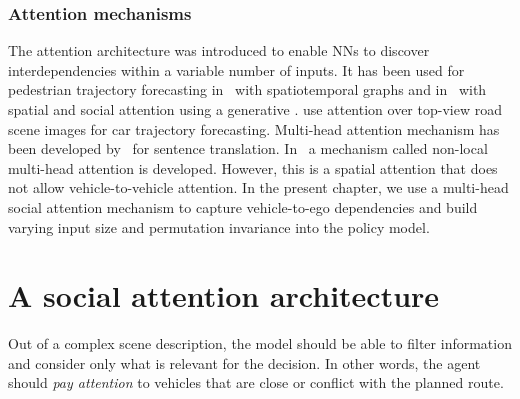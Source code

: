 \subsubsection{Attention mechanisms} 

The attention architecture was introduced to enable \glspl*{NN}  to discover interdepen\-dencies within a variable number of inputs.
It has been used for pedestrian trajectory forecasting in~\citep{Vemula2018} with spatiotemporal graphs and in~\citep{Sadeghian2019CVPR} with spatial and social attention using a generative . \citet{Sadeghian2018ECCV} use attention over top-view road scene images for car trajectory forecasting. Multi-head attention mechanism has been developed by~\citet{Vaswani2017} for sentence translation. In~\citep{Messaoud2019} a mechanism called non-local multi-head attention is developed. However, this is a spatial attention that does not allow vehicle-to-vehicle attention. In the present chapter, we use a multi-head social attention mechanism to capture vehicle-to-ego dependencies and build varying input size and permutation invariance into the policy model.

\section{A social attention architecture}
\label{sec:architecture}

Out of a complex scene description, the model should be able to filter information and consider only what is relevant for the decision. In other words, the agent should \emph{pay attention} to vehicles that are close or conflict with the planned route.

